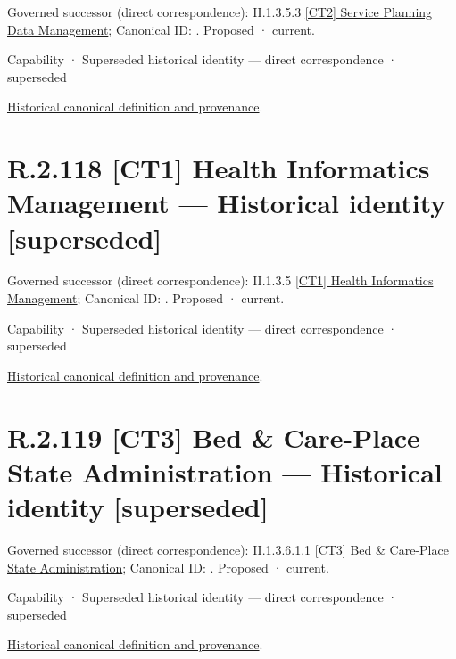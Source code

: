 {\small Governed successor (direct correspondence): II.1.3.5.3 \hyperref[element:4873cd4b960d45d8b93560d5c8b98500]{[CT2] Service Planning Data Management}; Canonical ID: \texttt{}. Proposed · current.}\par
\label{element:19263e0802cc4b88af7a345f1410cffd}
{\small Capability · Superseded historical identity — direct correspondence · superseded}\par
\href{../../../../continuum/strategy/capability/19263e0802cc4b88af7a345f1410cffd.md}{Historical canonical definition and provenance}.\par
\section*{R.2.118 [CT1] Health Informatics Management — Historical identity [superseded]}
\label{navigation:R.2.118}

{\small Governed successor (direct correspondence): II.1.3.5 \hyperref[element:a790b5f2c5a1497fa6ec09d7824da32e]{[CT1] Health Informatics Management}; Canonical ID: \texttt{}. Proposed · current.}\par
\label{element:50c56bac0dc540a2b392fc2376efc129}
{\small Capability · Superseded historical identity — direct correspondence · superseded}\par
\href{../../../../continuum/strategy/capability/50c56bac0dc540a2b392fc2376efc129.md}{Historical canonical definition and provenance}.\par
\section*{R.2.119 [CT3] Bed \& Care-Place State Administration — Historical identity [superseded]}
\label{navigation:R.2.119}

{\small Governed successor (direct correspondence): II.1.3.6.1.1 \hyperref[element:26a9383d7bb146a19141558d232843de]{[CT3] Bed \& Care-Place State Administration}; Canonical ID: \texttt{}. Proposed · current.}\par
\label{element:dd2e2ee1a68845c087ba93610752181b}
{\small Capability · Superseded historical identity — direct correspondence · superseded}\par
\href{../../../../continuum/strategy/capability/dd2e2ee1a68845c087ba93610752181b.md}{Historical canonical definition and provenance}.\par
